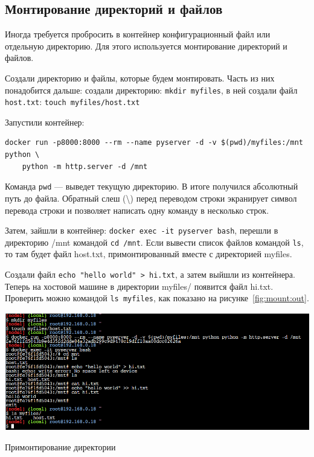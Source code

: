 \subsection{Монтирование директорий и файлов}
Иногда требуется пробросить в контейнер конфигурационный файл
или отдельную директорию. Для этого используется монтирование директорий
и файлов.\par
Создали директорию и файлы, которые будем монтировать.
Часть из них понадобится дальше: создали директорию:
\texttt{mkdir myfiles}, в ней создали файл \texttt{host.txt}:
\texttt{touch myfiles/host.txt}\par
Запустили контейнер:

\begin{verbatim}
docker run -p8000:8000 --rm --name pyserver -d -v $(pwd)/myfiles:/mnt python \
	python -m http.server -d /mnt
\end{verbatim}

Команда \texttt{pwd} --- выведет текущую директорию.
В итоге получился абсолютный путь до файла.
Обратный слеш (\textbackslash) перед переводом строки экранирует символ
перевода строки и позволяет написать одну команду в несколько строк.\par
Затем, зайшли в контейнер: \texttt{docker exec -it pyserver bash},
перешли в директорию /mnt командой \texttt{cd /mnt}.
Если вывести список файлов командой \texttt{ls}, то там будет файл host.txt,
примонтированный вместе с директорией myfiles.\par
Создали файл \verb|echo "hello world" > hi.txt|, а затем выйшли
из контейнера. Теперь на хостовой машине в директории myfiles/ появится файл
hi.txt. Проверить можно командой \texttt{ls myfiles}, как
показано на рисунке~\ref{fig:mount:out}.\par

\begin{image}
	\includegraphics[width=1\textwidth]{Screenshot from 2023-04-15 16-21-54}
	\caption{Примонтирование директории}
	\label{fig:mount:out}
\end{image}

